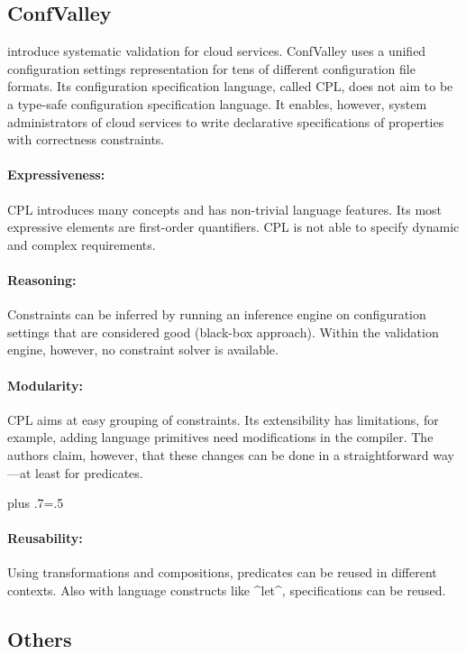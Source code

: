 \subsection{ConfValley}

\citet{huang2015confvalley} introduce systematic validation for cloud services.
ConfValley uses a unified configuration settings representation for tens of different configuration file formats.
Its configuration specification language, called CPL, does not aim to be a type-safe configuration specification language.
It enables, however, system administrators of cloud services to write declarative specifications of properties with correctness constraints.

\paragraph*{Expressiveness:}
CPL introduces many concepts and has non-trivial language features.
Its most expressive elements are first-order quantifiers.
CPL is not able to specify dynamic and complex requirements.

\paragraph*{Reasoning:}
Constraints can be inferred by running an inference engine on configuration settings that are considered good (black-box approach).
Within the validation engine, however, no constraint solver is available.

\paragraph*{Modularity:}
CPL aims at easy grouping of constraints.
Its extensibility has limitations, for example, adding language primitives need modifications in the compiler.
The authors claim, however, that these changes can be done in a straightforward way---at least for predicates.%
{\parfillskip=0pt plus .7\textwidth \emergencystretch=.5\textwidth \par}

\paragraph*{Reusability:}
Using transformations and compositions, predicates can be reused in different contexts.
Also with language constructs like ^let^, specifications can be reused.


\subsection{Others}

